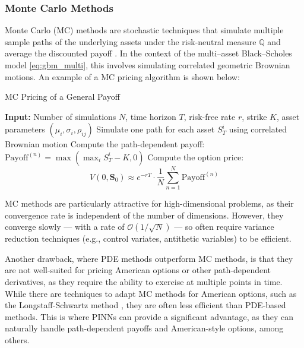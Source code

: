 \documentclass[12pt]{report} %
\theoremstyle{plain}           %
\theoremstyle{definition}      %
\theoremstyle{remark}          %
\begin{document}
\subsubsection{Monte Carlo Methods}
Monte Carlo (MC) methods are stochastic techniques that simulate multiple sample paths 
of the underlying assets under the risk-neutral measure $\mathbb{Q}$ and average the 
discounted payoff \cite{glasserman2004monte}. In the context of the multi–asset Black–Scholes 
model \eqref{eq:gbm_multi}, this involves simulating correlated geometric Brownian motions. 
An example of a MC pricing algorithm is shown below:
\begin{algorithm}[H]
	\caption{MC Pricing of a General Payoff}
	\begin{algorithmic}[1]
	\STATE \textbf{Input:} Number of simulations $N$, time horizon $T$, risk-free rate $r$, strike $K$, asset parameters $(\mu_i, \sigma_i, \rho_{ij})$
	  \STATE Simulate one path for each asset $S_T^i$ using correlated Brownian motion
	  \STATE Compute the path-dependent payoff: $\text{Payoff}^{(n)} = \max\left(\max_i S_T^{i} - K, 0\right)$
	\ENDFOR
	\STATE Compute the option price:
	\[
	V(0, \mathbf{S}_0) \approx e^{-rT} \cdot \frac{1}{N} \sum_{n=1}^{N} \text{Payoff}^{(n)}
	\]
	\end{algorithmic}
\end{algorithm}
MC methods are particularly attractive for high-dimensional problems, 
as their convergence rate is independent of the number of dimensions. However, 
they converge slowly — with a rate of $\mathcal{O}(1/\sqrt{N})$ — so often require 
variance reduction techniques (e.g., control variates, antithetic variables) to be 
efficient.

Another drawback, where PDE methods outperform MC methods, is that they are not well-suited for
pricing American options or other path-dependent derivatives, as they require
the ability to exercise at multiple points in time. While there are techniques to adapt MC 
methods for American options, such as the Longstaff-Schwartz method \cite{longstaffshawrtz}, they are often less
efficient than PDE-based methods. This is where PINNs can provide a significant advantage, 
as they can naturally handle path-dependent payoffs and American-style options, among others.

\end{document}
